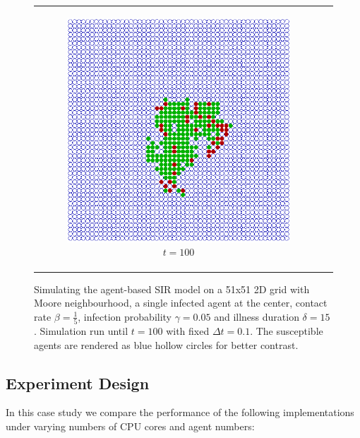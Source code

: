 \begin{figure}
\begin{center}
\begin{tabular}{c c}
		\begin{subfigure}[b]{0.4\textwidth}
			\centering
			\includegraphics[width=1\textwidth, angle=0]{./fig/sir/vis/51x51agents_t100_01dt.png}
			\caption{$t = 100$}
			\label{fig:vis_51x51agents_t100_01dt}
		\end{subfigure}
	\end{tabular}
	
	\caption{Simulating the agent-based SIR model on a 51x51 2D grid with Moore neighbourhood, a single infected agent at the center, contact rate $\beta = \frac{1}{5}$, infection probability $\gamma = 0.05$ and illness duration $\delta = 15$ . Simulation run until $t = 100$ with fixed $\Delta t = 0.1$. The susceptible agents are rendered as blue hollow circles for better contrast.}
	\label{fig:vis_sir}
\end{center}
\end{figure}

\subsection{Experiment Design}
In this case study we compare the performance of the following implementations under varying numbers of CPU cores and agent numbers:

